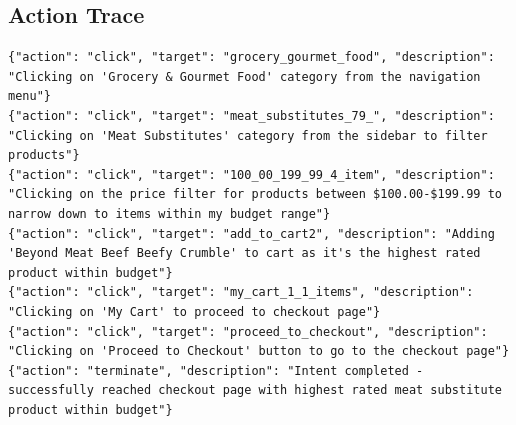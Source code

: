 \documentclass[manuscript,review,anonymous]{acmart}
\begin{document}
\subsection{Action Trace}
\begin{verbatim}
{"action": "click", "target": "grocery_gourmet_food", "description": "Clicking on 'Grocery & Gourmet Food' category from the navigation menu"}
{"action": "click", "target": "meat_substitutes_79_", "description": "Clicking on 'Meat Substitutes' category from the sidebar to filter products"}
{"action": "click", "target": "100_00_199_99_4_item", "description": "Clicking on the price filter for products between $100.00-$199.99 to narrow down to items within my budget range"}
{"action": "click", "target": "add_to_cart2", "description": "Adding 'Beyond Meat Beef Beefy Crumble' to cart as it's the highest rated product within budget"}
{"action": "click", "target": "my_cart_1_1_items", "description": "Clicking on 'My Cart' to proceed to checkout page"}
{"action": "click", "target": "proceed_to_checkout", "description": "Clicking on 'Proceed to Checkout' button to go to the checkout page"}
{"action": "terminate", "description": "Intent completed - successfully reached checkout page with highest rated meat substitute product within budget"}
\end{verbatim}
\end{document}
